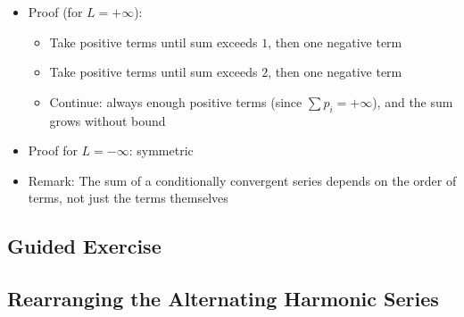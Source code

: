 \documentclass[
  10pt,
  letterpaper,
]{scrbook}
\providecommand{\tightlist}{%
  \setlength{\itemsep}{0pt}\setlength{\parskip}{0pt}}
\begin{document}
\begin{itemize}
\begin{itemize}
    \begin{itemize}
    \tightlist
    \item
      Take positive terms \(p_1, p_2, \ldots\) until the partial sum
      first exceeds \(L\)
    \item
      Then take negative terms \(q_1, q_2, \ldots\) until the partial
      sum first drops below \(L\)
    \item
      Repeat: take positive terms until exceeding \(L\), then negative
      until dropping below \(L\)
    \end{itemize}
  \item
    This process uses every term exactly once (since both \(\sum p_i\)
    and \(\sum |q_i|\) diverge, we never run out)
  \item
    Let \(T_N\) denote the partial sums. By construction, after each
    ``switch'' the partial sum is within one term of \(L\)
  \item
    Since \(p_i \to 0\) and \(q_i \to 0\), these overshoots shrink to
    zero
  \item
    Therefore \(T_N \to L\)
  \end{itemize}
\item
  Proof (for \(L = +\infty\)):

  \begin{itemize}
  \tightlist
  \item
    Take positive terms until sum exceeds \(1\), then one negative term
  \item
    Take positive terms until sum exceeds \(2\), then one negative term
  \item
    Continue: always enough positive terms (since
    \(\sum p_i = +\infty\)), and the sum grows without bound
  \end{itemize}
\item
  Proof for \(L = -\infty\): symmetric
\item
  Remark: The sum of a conditionally convergent series depends on the
  order of terms, not just the terms themselves
\end{itemize}

\subsection{Guided Exercise}\label{guided-exercise-7}

\subsection{Rearranging the Alternating Harmonic
Series}\label{rearranging-the-alternating-harmonic-series}
\end{document}
